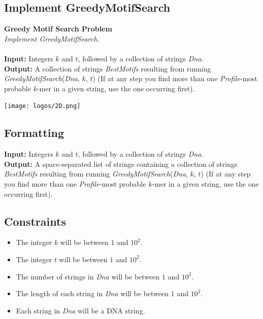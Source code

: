 \documentclass{article}
\begin{document}
\subsection{Implement GreedyMotifSearch}
\hline\vspace{5}
\noindent\textbf{Greedy Motif Search Problem}\\
\emph{Implement GreedyMotifSearch}.\\ \\
\textbf{Input:} Integers $k$ and $t$, followed by a collection of strings \emph{Dna}.\\
\textbf{Output:} A collection of strings \emph{BestMotifs} resulting from running \emph{GreedyMotifSearch}(\emph{Dna}, $k$, $t$) (If at any step you find more than one \emph{Profile}-most probable $k$-mer in a given string, use the one occurring first).
\begin{center}
    \texttt{[image: logos/2D.png]} 
\end{center}
\hline\vspace{5}

\subsection*{Formatting}
\textbf{Input:} Integers $k$ and $t$, followed by a collection of strings \emph{Dna}.\\
\noindent\textbf{Output:} A space-separated list of strings containing a collection of strings \emph{BestMotifs} resulting from running \emph{GreedyMotifSearch}(\emph{Dna}, $k$, $t$) (If at any step you find more than one \emph{Profile}-most probable $k$-mer in a given string, use the one occurring first).

\subsection*{Constraints}
\begin{itemize}
    \item The integer $k$ will be between $1$ and $10^2$.
    \item The integer $t$ will be between $1$ and $10^2$.
    \item The number of strings in \emph{Dna} will be between $1$ and $10^2$.
    \item The length of each string in \emph{Dna} will be between $1$ and $10^2$.
    \item Each string in \emph{Dna} will be a DNA string.
\end{itemize}
\pagebreak
\end{document}

